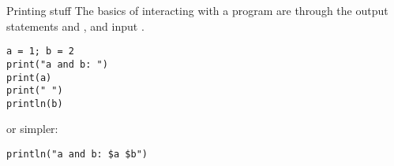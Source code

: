 \begin{comment}
\begin{exercise}
  \label{ex:hello-line}
  Take the `hello world' program you wrote above, and duplicate the
  hello-line. Compile and run.

  Does it make a difference whether you have the two hellos on the
  same line or on different lines?

  Experiment with other changes to the layout of your source. Find at
  least one change that leads to a compiler error. Can you relate the
  message to the error?
\end{exercise}

\begin{block}{Errors}
  \label{sl:program-errors}
  There are two types of errors that your program can have:
  \begin{enumerate}
  \item \emph{Syntax}\index{error!syntax} or
    \emph{compile-time}\index{error!compile-time} errors: these arise
    if what you write is not according to the language specification.
    The compiler catches these errors, and it refuses to produce a
    \indextermsub{binary}{file}.
  \item \emph{Run-time}\index{error!run-time} errors: these arise if
    your code is syntactically correct, and the compiler has produced
    an executable, but the program does not behave the way you
    intended or foresaw. Examples are divide-by-zero or indexing
    outside the bounds of an array.
  \end{enumerate}
\end{block}

\begin{review}
  \label{q:compile}
  True or false?
  \begin{itemize}
  \item If your program compiles correctly, it is correct.
  \item If you run your program and you get the right output, it is correct.
  \end{itemize}  
\end{review}
\end{comment}

\begin{block}{Printing stuff}
  The basics of interacting with a program are through the output
  statements  and ,
  and input .
  \begin{lstlisting}
a = 1; b = 2
print("a and b: ")
print(a)
print(" ")
println(b)
  \end{lstlisting}
or simpler:
  \begin{lstlisting}
println("a and b: $a $b")
  \end{lstlisting}
\end{block}

